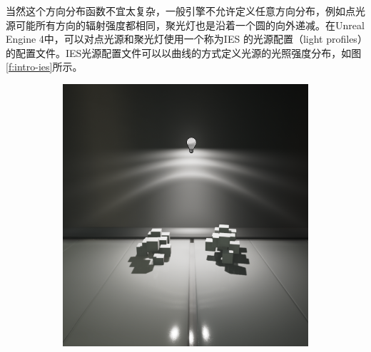 当然这个方向分布函数不宜太复杂，一般引擎不允许定义任意方向分布，例如点光源可能所有方向的辐射强度都相同，聚光灯也是沿着一个圆的向外递减。在Unreal Engine 4中，可以对点光源和聚光灯使用一个称为IES\cite{m:IESLightProfiles} 的光源配置（light profiles）的配置文件。IES光源配置文件可以以曲线的方式定义光源的光照强度分布，如图\ref{f:intro-ies}所示。

\begin{figure}
\begin{fullwidth}
	\begin{subfigure}[b]{0.209\thewidth}
		\includegraphics[width=1.\textwidth]{figures/intro/IES_01}
	\end{subfigure}
	\begin{subfigure}[b]{0.213\thewidth}

\end{subfigure}
\end{fullwidth}
\end{figure}
